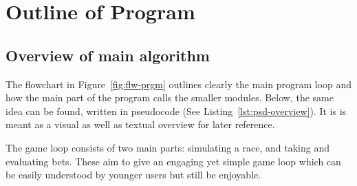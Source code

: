 \documentclass[11pt]{article}
\begin{document}
\section{Outline of Program}
\subsection{Overview of main algorithm}
The flowchart in Figure~\ref{fig:flw-prgm} outlines clearly the main program loop and how the main
part of the program calls the smaller modules. Below, the same idea can be found, written in pseudocode
(See Listing~\ref{lst:psd-overview}). It is is meant as a visual as well as textual overview for later
reference.

The game loop consists of two main parts: simulating a race, and taking and evaluating bets. These aim to
give an engaging yet simple game loop which can be easily understood by younger users but still be
enjoyable.
\end{document}
